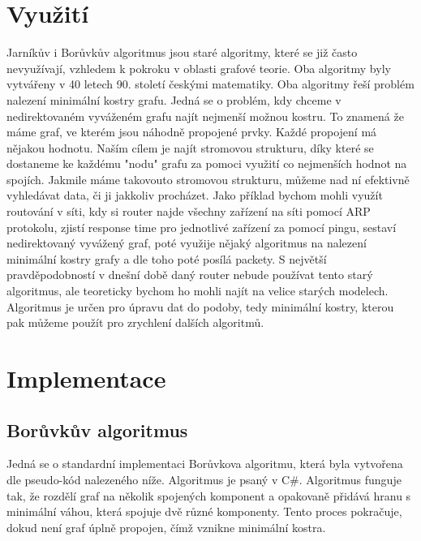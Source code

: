 \documentclass[11pt]{article}
\begin{document}
\section{Využití}
Jarníkův i Borůvkův algoritmus jsou staré algoritmy, které se již často nevyužívají, vzhledem k pokroku 
v oblasti grafové teorie. Oba algoritmy byly vytvářeny v 40 letech 90. století českými matematiky.
Oba algoritmy řeší problém nalezení minimální kostry grafu. Jedná se o problém, kdy chceme v nedirektovaném
vyváženém grafu najít nejmenší možnou kostru. To znamená že máme graf, ve kterém jsou náhodně propojené prvky.
Každé propojení má nějakou hodnotu. Naším cílem je najít stromovou strukturu, díky které se dostaneme ke každému "nodu"
grafu za pomoci využití co nejmenších hodnot na spojích. Jakmile máme takovouto stromovou strukturu, můžeme nad ní efektivně 
vyhledávat data, či ji jakkoliv procházet. Jako příklad bychom mohli využít routování v síti, kdy si router najde
všechny zařízení na síti pomocí ARP protokolu, zjistí response time pro jednotlivé zařízení za pomocí pingu, 
sestaví nedirektovaný vyvážený graf, poté využije nějaký algoritmus na nalezení minimální kostry grafy a 
dle toho poté posílá packety. S největší pravděpodobností v dnešní době daný router nebude používat tento starý 
algoritmus, ale teoreticky bychom ho mohli najít na velice starých modelech. Algoritmus je určen pro úpravu dat do podoby, tedy minimální kostry, kterou pak můžeme použít pro zrychlení dalších algoritmů.

\pagebreak

\section{Implementace}

\subsection{Borůvkův algoritmus}
Jedná se o standardní implementaci Borůvkova algoritmu, která byla vytvořena dle pseudo-kód nalezeného níže. Algoritmus je psaný v C\#.
Algoritmus funguje tak, že rozdělí graf na několik 
spojených komponent a opakovaně přidává hranu s minimální váhou, která spojuje dvě různé komponenty. 
Tento proces pokračuje, dokud není graf úplně propojen, čímž vznikne minimální kostra.
\end{document}
